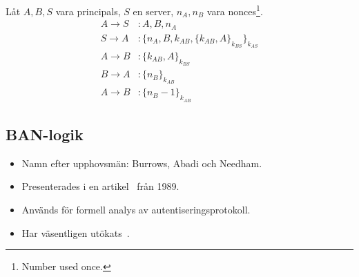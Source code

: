 \documentclass{beamer}
\theoremstyle{definition}
\theoremstyle{remark}
\newcommand{\encrypt}[2]{\{#1\}_{#2}}
\begin{document}
\begin{frame}
  \begin{example}
    Låt \(A, B, S\) vara principals, \(S\) en server, \(n_A, n_B\) vara 
    nonces\footnote{Number used once.}.
    \begin{align*}
      A\to S &\colon A, B, n_A \\
      S\to A &\colon \encrypt{n_A, B, k_{AB}, \encrypt{k_{AB}, 
      A}{k_{BS}}}{k_{AS}} \\
      A\to B &\colon \encrypt{k_{AB}, A}{k_{BS}} \\
      B\to A &\colon \encrypt{n_B}{k_{AB}} \\
      A\to B &\colon \encrypt{n_B-1}{k_{AB}}
    \end{align*}
  \end{example}
\end{frame}

\subsection{BAN-logik}

\begin{frame}
  \begin{itemize}
    \item Namn efter upphovsmän: Burrows, Abadi och Needham.
    \item Presenterades i en artikel~\cite{BAN90alo} från 1989.
    \item Används för formell analys av autentiseringsprotokoll.
    \item Har väsentligen utökats~\cite{Syverson2001tlo}.
  \end{itemize}
\end{frame}
\end{document}
